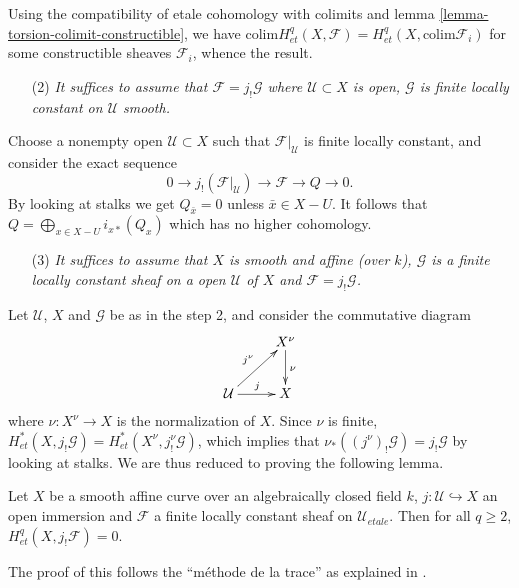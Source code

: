 \noindent
Using the compatibility of etale cohomology with colimits and lemma
\ref{lemma-torsion-colimit-constructible}, we have $\text{colim}
H_{et}^q(X, \mathcal{F}) = H_{et}^q(X, \text{colim} \mathcal{F}_i)$ for some
constructible sheaves $\mathcal{F}_i$, whence the result.

\begin{enumerate}
\item[(2)]
{\it It suffices to assume that $\mathcal{F} = j_!\mathcal{G}$ where
$\mathcal{U}\subset X$ is open, $\mathcal{G}$ is finite locally constant on
$\mathcal{U}$ smooth.}
\end{enumerate}

\noindent
Choose a nonempty open $\mathcal{U}\subset X$ such that
$\mathcal{F}|_\mathcal{U}$ is finite locally constant, and consider the exact
sequence
$$
0\to j_!(\mathcal{F}|_\mathcal{U})\to \mathcal{F}\to Q\to 0.
$$
By looking at stalks we get $Q_{\bar x}=0$ unless $\bar x\in X-U$. It follows
that $\displaystyle Q = \bigoplus_{x\in X-U} i_{x*} (Q_x)$
which has no higher cohomology.

\begin{enumerate}
\item[(3)]
{\it It suffices to assume that $X$ is smooth and affine (over $k$),
$\mathcal{G}$ is a finite locally constant sheaf on a open $\mathcal{U}$ of $X$
and $\mathcal{F} = j_!\mathcal{G}$.}
\end{enumerate}

\noindent
Let $\mathcal{U}$, $X$ and $\mathcal{G}$ be as in the step 2, and consider the
commutative diagram
$$
\xymatrix{
& {X^\nu} \ar^{\nu}[d]\\
{\mathcal{U}} \ar^{j}[r] \ar^{j^\nu}[ur] & {X}
}
$$
where $\nu: X^\nu \to X$ is the normalization of $X$. Since $\nu$ is finite,
$H_{et}^*(X, j_!\mathcal{G}) = H_{et}^*(X^\nu, j^\nu_!\mathcal{G})$, which
implies that $\nu_*((j^\nu)_!\mathcal{G}) = j_!\mathcal{G}$ by looking at
stalks. We are thus reduced to proving the following lemma.

\begin{lemma}
\label{lemma-vanishing-easier}
Let $X$ be a smooth affine curve over an algebraically closed field $k$, $j:
\mathcal{U} \hookrightarrow X$ an open immersion and $\mathcal{F}$ a finite
locally constant sheaf on $\mathcal{U}_{etale}$. Then for all $q \geq 2$,
$H_{et}^q(X, j_! \mathcal{F}) = 0$.
\end{lemma}


\noindent
The proof of this follows the
``m\'ethode de la trace''
as explained in \cite[Expos\'e IX, \S5]{SGA4}.

